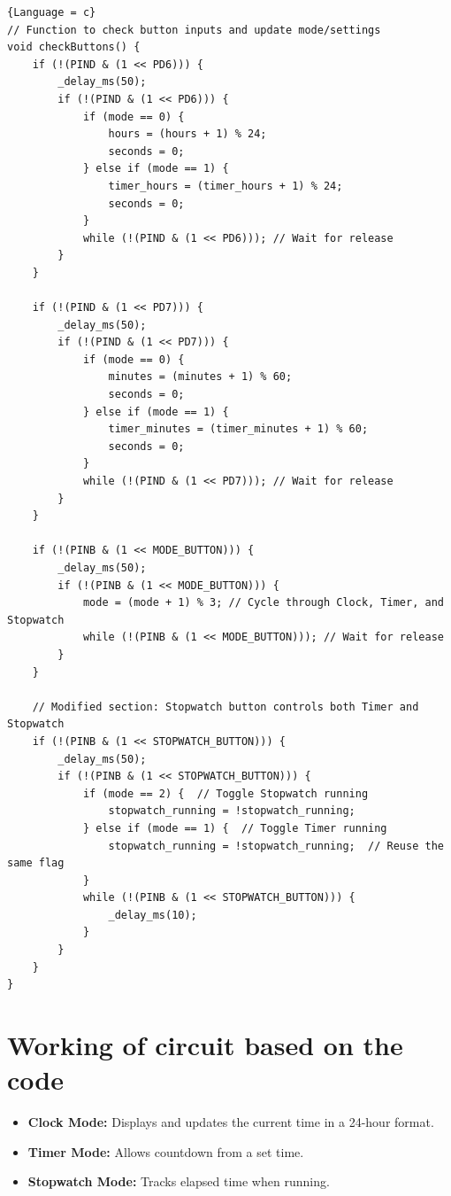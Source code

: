 \documentclass[a4paper,12pt]{article}
\begin{document}
\begin{lstlisting}{Language = c}
// Function to check button inputs and update mode/settings
void checkButtons() {
    if (!(PIND & (1 << PD6))) {
        _delay_ms(50);
        if (!(PIND & (1 << PD6))) {
            if (mode == 0) {
                hours = (hours + 1) % 24;
                seconds = 0;
            } else if (mode == 1) {
                timer_hours = (timer_hours + 1) % 24;
                seconds = 0;
            }
            while (!(PIND & (1 << PD6))); // Wait for release
        }
    }

    if (!(PIND & (1 << PD7))) {
        _delay_ms(50);
        if (!(PIND & (1 << PD7))) {
            if (mode == 0) {
                minutes = (minutes + 1) % 60;
                seconds = 0;
            } else if (mode == 1) {
                timer_minutes = (timer_minutes + 1) % 60;
                seconds = 0;
            }
            while (!(PIND & (1 << PD7))); // Wait for release
        }
    }

    if (!(PINB & (1 << MODE_BUTTON))) {
        _delay_ms(50);
        if (!(PINB & (1 << MODE_BUTTON))) {
            mode = (mode + 1) % 3; // Cycle through Clock, Timer, and Stopwatch
            while (!(PINB & (1 << MODE_BUTTON))); // Wait for release
        }
    }

    // Modified section: Stopwatch button controls both Timer and Stopwatch
    if (!(PINB & (1 << STOPWATCH_BUTTON))) {
        _delay_ms(50);
        if (!(PINB & (1 << STOPWATCH_BUTTON))) {
            if (mode == 2) {  // Toggle Stopwatch running
                stopwatch_running = !stopwatch_running;
            } else if (mode == 1) {  // Toggle Timer running
                stopwatch_running = !stopwatch_running;  // Reuse the same flag
            }
            while (!(PINB & (1 << STOPWATCH_BUTTON))) {
                _delay_ms(10);
            }
        }
    }
}
\end{lstlisting}

\section{Working of circuit based on the code}
\begin{itemize}
    \item \textbf{Clock Mode:} Displays and updates the current time in a 24-hour format.
    \item \textbf{Timer Mode:} Allows countdown from a set time.
    \item \textbf{Stopwatch Mode:} Tracks elapsed time when running.
\end{itemize}
\end{document}
